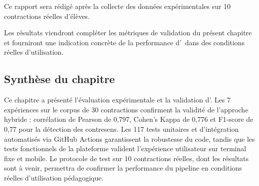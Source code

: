 \vspace{1cm}
\begin{tcolorbox}[colback=yellow!10,colframe=orange!80,title=\textbf{À COMPLÉTER}]
Ce rapport sera rédigé après la collecte des données expérimentales sur 10 contractions réelles d'élèves.
\end{tcolorbox}
\vspace{1cm}

Les résultats viendront compléter les métriques de validation du présent chapitre et fourniront une indication concrète de la performance d'\AZIZA\ dans des conditions réelles d'utilisation.

\subsection*{Synthèse du chapitre}

Ce chapitre a présenté l'évaluation expérimentale et la validation d'\AZIZA. Les 7 expériences sur le corpus de 30 contractions confirment la validité de l'approche hybride : corrélation de Pearson de 0,797, Cohen's Kappa de 0,776 et F1-score de 0,77 pour la détection des contresens. Les 117 tests unitaires et d'intégration automatisés via GitHub Actions garantissent la robustesse du code, tandis que les tests fonctionnels de la plateforme valident l'expérience utilisateur sur terminal fixe et mobile. Le protocole de test sur 10 contractions réelles, dont les résultats sont à venir, permettra de confirmer la performance du pipeline en conditions réelles d'utilisation pédagogique.

